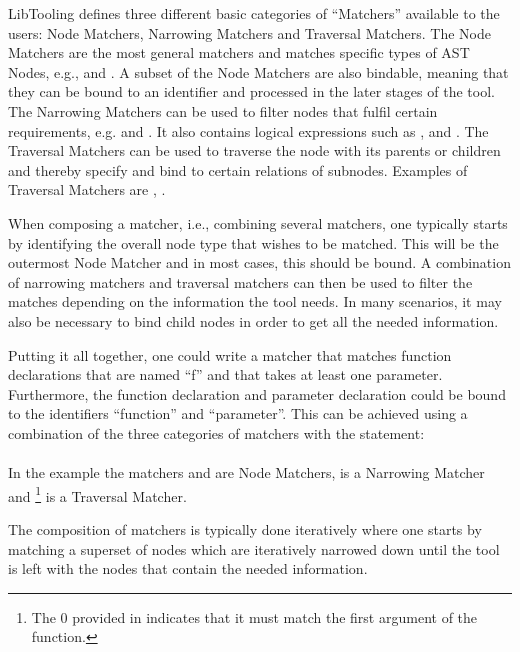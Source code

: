 LibTooling defines three different basic categories of ``Matchers'' available to the users: Node Matchers, Narrowing Matchers and Traversal Matchers.
The Node Matchers are the most general matchers and matches specific types of AST Nodes, e.g.,  and . A subset of the Node Matchers are also bindable, meaning that they can be bound to an identifier and processed in the later stages of the tool.
The Narrowing Matchers can be used to filter nodes that fulfil certain requirements, e.g.  and . It also contains logical expressions such as , and .
The Traversal Matchers can be used to traverse the node with its parents or children and thereby specify and bind to certain relations of subnodes. Examples of Traversal Matchers are ,  \cite{llvmASTMatcherReference}.

When composing a matcher, i.e., combining several matchers, one typically starts by identifying the overall node type that wishes to be matched. This will be the outermost Node Matcher and in most cases, this should be bound.
A combination of narrowing matchers and traversal matchers can then be used to filter the matches depending on the information the tool needs.
In many scenarios, it may also be necessary to bind child nodes in order to get all the needed information.

Putting it all together, one could write a matcher that matches function declarations that are named ``f'' and that takes at least one parameter. Furthermore, the function declaration and parameter declaration could be bound to the identifiers ``function'' and ``parameter''.
This can be achieved using a combination of the three categories of matchers with the statement:\\ \\
In the example the matchers  and  are Node Matchers,  is a Narrowing Matcher and \footnote{The 0 provided in  indicates that it must match the first argument of the function.} is a Traversal Matcher.

The composition of matchers is typically done iteratively where one starts by matching a superset of nodes which are iteratively narrowed down until the tool is left with the nodes that contain the needed information. 

